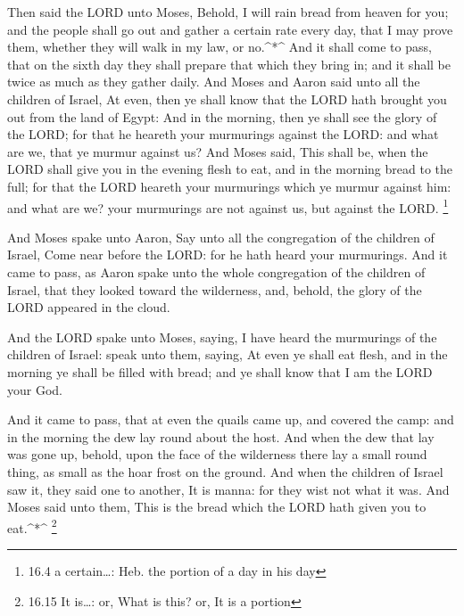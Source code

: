  Then said the LORD unto Moses, Behold, I will rain bread
from heaven for you; and the people shall go out and gather a certain
rate every day, that I may prove them, whether they will walk in my law,
or no.\^{}*\^{}  And it shall come to pass, that on the
sixth day they shall prepare that which they bring in; and it shall be
twice as much as they gather daily.  And Moses and Aaron
said unto all the children of Israel, At even, then ye shall know that
the LORD hath brought you out from the land of Egypt:  And
in the morning, then ye shall see the glory of the LORD; for that he
heareth your murmurings against the LORD: and what are we, that ye
murmur against us?  And Moses said, This shall be, when the
LORD shall give you in the evening flesh to eat, and in the morning
bread to the full; for that the LORD heareth your murmurings which ye
murmur against him: and what are we? your murmurings are not against us,
but against the LORD. \footnote{16.4 a certain\ldots: Heb. the portion
  of a day in his day}

 And Moses spake unto Aaron, Say unto all the congregation
of the children of Israel, Come near before the LORD: for he hath heard
your murmurings.  And it came to pass, as Aaron spake unto
the whole congregation of the children of Israel, that they looked
toward the wilderness, and, behold, the glory of the LORD appeared in
the cloud.

 And the LORD spake unto Moses, saying,  I
have heard the murmurings of the children of Israel: speak unto them,
saying, At even ye shall eat flesh, and in the morning ye shall be
filled with bread; and ye shall know that I am the LORD your God.

 And it came to pass, that at even the quails came up, and
covered the camp: and in the morning the dew lay round about the host.
 And when the dew that lay was gone up, behold, upon the
face of the wilderness there lay a small round thing, as small as the
hoar frost on the ground.  And when the children of Israel
saw it, they said one to another, It is manna: for they wist not what it
was. And Moses said unto them, This is the bread which the LORD hath
given you to eat.\^{}*\^{} \footnote{16.15 It is\ldots: or, What is
  this? or, It is a portion}


